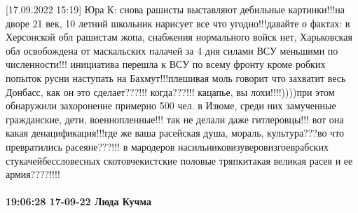 [17.09.2022 15:19] Юра К: снова рашисты выставляют дебильные картинки!!!на дворе 21 век, 10 летний школьник нарисует все что угодно!!!давайте о фактах: в Херсонской обл рашистам жопа, снабжения нормального войск нет, Харьковская обл освобождена от маскальских палачей за 4 дня силами ВСУ меньшими по численности!!! инициатива перешла к ВСУ по всему фронту кроме робких попыток русни наступать на Бахмут!!!плешивая моль говорит что захватит весь Донбасс, как он это сделает???!!! когда???!!! кацапье, вы лохи!!!!))))при этом обнаружили захоронение примерно 500 чел. в Изюме, среди них замученные гражданские, дети, военнопленные!!! так не делали даже гитлеровцы!!! вот она какая денацификация!!!где же ваша расейская душа, мораль, культура???во что превратились расеяне???!!! в мародеров  насильниковизуверовизгоеврабских стукачейбессловесных скотовчекистские половые тряпкитакая великая расея и ее армия????!!!!

\paragraph{19:06:28 17-09-22 Люда Кучма}


